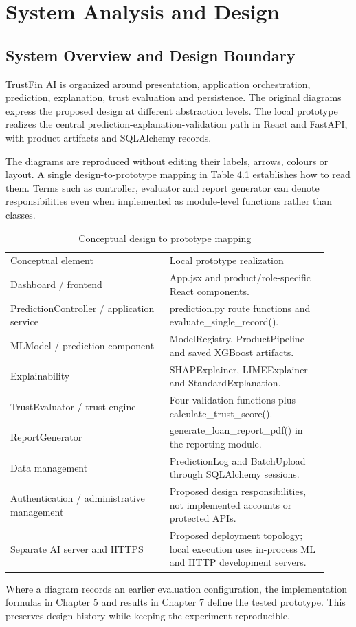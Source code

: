 \documentclass[12pt,a4paper]{report}
\begin{document}
\chapter{System Analysis and Design}
\section{System Overview and Design Boundary}
TrustFin AI is organized around presentation, application orchestration, prediction, explanation, trust evaluation and persistence. The original diagrams express the proposed design at different abstraction levels. The local prototype realizes the central prediction-explanation-validation path in React and FastAPI, with product artifacts and SQLAlchemy records.

The diagrams are reproduced without editing their labels, arrows, colours or layout. A single design-to-prototype mapping in Table 4.1 establishes how to read them. Terms such as controller, evaluator and report generator can denote responsibilities even when implemented as module-level functions rather than classes.

\begin{longtable}{p{0.46\linewidth}p{0.46\linewidth}}
\caption{Conceptual design to prototype mapping}\\

Conceptual element & Local prototype realization\\
Dashboard / frontend & App.jsx and product/role-specific React components.\\
PredictionController / application service & prediction.py route functions and evaluate\_single\_record().\\
MLModel / prediction component & ModelRegistry, ProductPipeline and saved XGBoost artifacts.\\
Explainability & SHAPExplainer, LIMEExplainer and StandardExplanation.\\
TrustEvaluator / trust engine & Four validation functions plus calculate\_trust\_score().\\
ReportGenerator & generate\_loan\_report\_pdf() in the reporting module.\\
Data management & PredictionLog and BatchUpload through SQLAlchemy sessions.\\
Authentication / administrative management & Proposed design responsibilities, not implemented accounts or protected APIs.\\
Separate AI server and HTTPS & Proposed deployment topology; local execution uses in-process ML and HTTP development servers.\\
\end{longtable}
Where a diagram records an earlier evaluation configuration, the implementation formulas in Chapter 5 and results in Chapter 7 define the tested prototype. This preserves design history while keeping the experiment reproducible.
\end{document}
